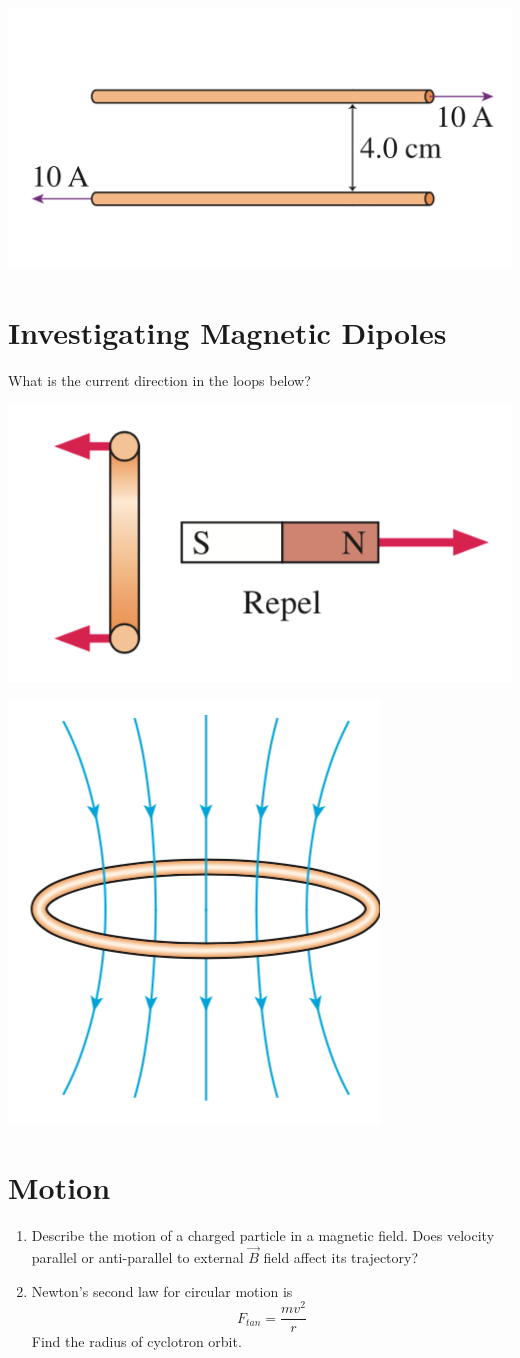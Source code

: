\documentclass[12pt]{article}
\begin{document}
\includegraphics[width=.4\linewidth]{W7_3}

\newpage
\section{Investigating Magnetic Dipoles}

What is the current direction in the loops below?

\includegraphics[width=.2\linewidth]{W7_4}

\includegraphics[width=.2\linewidth]{W7_5}



\section{Motion}

\begin{enumerate}
	\item Describe the motion of a charged particle in a magnetic field. Does velocity parallel or anti-parallel to external $\vec{B}$ field affect its trajectory?
	\item Newton's second law for circular motion is $$ F_{tan} = \frac{mv^2}{r}$$
		Find the radius of cyclotron orbit.


	
\end{enumerate}
\end{document}

